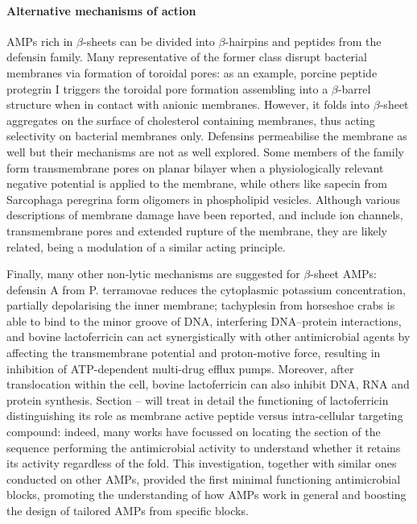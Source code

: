 \documentclass[a4paper,11pt]{extreport}
\begin{document}
\paragraph{Alternative mechanisms of action} AMPs rich in $\beta$-sheets can be divided into $\beta$-hairpins and peptides from the defensin family.\cite{Nguyen2011}
%
Many representative of the former class disrupt bacterial membranes via formation of toroidal pores: as an example, porcine peptide protegrin I triggers the toroidal pore formation assembling into a $\beta$-barrel structure when in contact with anionic membranes. However, it folds into $\beta$-sheet aggregates on the surface of cholesterol containing membranes, thus acting selectivity on bacterial membranes only.\cite{Tang2009}
%
Defensins permeabilise the membrane as well but their mechanisms are not as well explored.\cite{Lehrer2004,Zasloff2002,Fujii1993}
%
Some members of the family form transmembrane pores on planar bilayer when a physiologically relevant negative potential is applied to the membrane,\cite{Kagan1990}
%
while others like sapecin  from Sarcophaga peregrina form oligomers in phospholipid vesicles.\cite{Takeuchi2004}
%
Although various descriptions of membrane damage have been reported, and include ion channels, transmembrane pores and extended rupture of the membrane, they are likely related, being a modulation of a similar acting principle.\cite{Dathe1999}

Finally, many other non-lytic mechanisms are suggested for $\beta$-sheet AMPs: defensin A from P. terramovae reduces the cytoplasmic potassium concentration, partially depolarising the inner membrane; tachyplesin from horseshoe crabs is able to bind to the minor groove of DNA, interfering DNA–protein interactions,\cite{Yonezawa1992}
%
and bovine lactoferricin can act synergistically with other antimicrobial agents by affecting the transmembrane potential and proton-motive force, resulting in inhibition of ATP-dependent multi-drug efflux pumps.\cite{Gifford2005}
%
Moreover, after translocation within the cell, bovine lactoferricin can also inhibit DNA, RNA and protein synthesis. Section -- will treat in detail the functioning of lactoferricin distinguishing its role as membrane active peptide versus intra-cellular targeting compound: indeed, many works have focussed on locating the section of the sequence performing the antimicrobial activity\cite{Tomita1994,Hwang1998,Schibli1999,Nguyen2005} to understand whether it retains its activity regardless of the fold. This investigation, together with similar ones conducted on other AMPs\cite{???}, provided the first minimal functioning antimicrobial blocks, promoting the understanding of how AMPs work in general and boosting the design of tailored AMPs from specific blocks.
\end{document}
